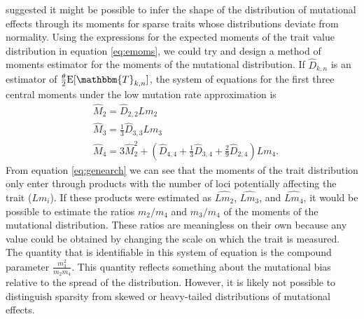 \citet{Schraiber2015} suggested it might be possible to infer the shape of the
distribution of mutational effects through its moments for sparse traits whose
distributions deviate from normality. Using the expressions for the expected
moments of the trait value distribution in equation \eqref{eq:emoms}, we could
try and design a method of moments estimator for the moments of the mutational
distribution. If $\hat{D}_{k,n}$ is an estimator of $\T \E[\mathbbm{T}_{k,n}]$,
the system of equations for the first three central moments under the low
mutation rate approximation is
\begin{align}
\label{eq:genearch}
  &\widehat{M}_2 = \widehat{D}_{2,2}Lm_2 \nonumber \\
  &\widehat{M}_3 = \frac{1}{3}\widehat{D}_{3,3}Lm_3 \nonumber \\
  &\widehat{M}_4 = 3\widehat{M}_2^2 + (\widehat{D}_{4,4} + \frac{1}{3} \widehat{D}_{3,4} + \frac{2}{9} \widehat{D}_{2,4})Lm_4.
\end{align}
From equation \eqref{eq:genearch} we can see that the moments of the trait
distribution only enter through products with the number of loci potentially
affecting the trait ($Lm_i$). If these products were estimated as
$\widehat{Lm_2}$, $\widehat{Lm_3}$, and $\widehat{Lm_4}$, it would be possible
to estimate the ratios $m_2/m_4$ and $m_3/m_4$ of the moments of the mutational
distribution. These ratios are meaningless on their own because any value could
be obtained by changing the scale on which the trait is measured. The quantity
that is identifiable in this system of equation is the compound parameter
$\frac{m_3^2}{m_2m_4}$. This quantity reflects something about the mutational
bias relative to the spread of the distribution. However, it is likely not
possible to distinguish sparsity from skewed or heavy-tailed distributions of
mutational effects. 

